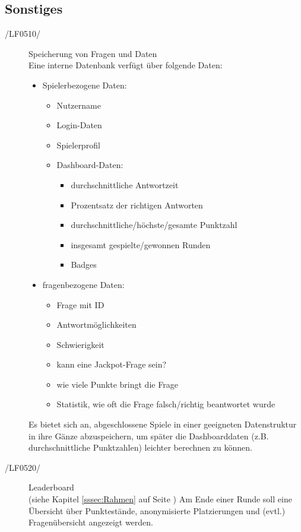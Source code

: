 \documentclass[11pt,a4paper]{scrreprt}
\begin{document}
\subsection{Sonstiges}
\begin{description}
\item[/LF0510/] Speicherung von Fragen und Daten \\
Eine interne Datenbank verfügt über folgende Daten:
	\begin{itemize}
	\item Spielerbezogene Daten:
		\begin{itemize}
		\item Nutzername
		\item Login-Daten
		\item Spielerprofil
		\item Dashboard-Daten:
			\begin{itemize}
			\item durchschnittliche Antwortzeit
			\item Prozentsatz der richtigen Antworten
			\item durchschnittliche/höchste/gesamte Punktzahl
			\item insgesamt gespielte/gewonnen Runden
			\item Badges
			\end{itemize}
		\end{itemize}
	\item fragenbezogene Daten:
		\begin{itemize}
		\item Frage mit ID
		\item Antwortmöglichkeiten
		\item Schwierigkeit
		\item kann eine Jackpot-Frage sein?
		\item wie viele Punkte bringt die Frage
		\item Statistik, wie oft die Frage falsch/richtig beantwortet wurde
		\end{itemize}
	\end{itemize}
Es bietet sich an, abgeschlossene Spiele in einer geeigneten Datenstruktur in ihre Gänze abzuspeichern, um später die Dashboarddaten (z.B. durchschnittliche Punktzahlen) leichter berechnen zu können.
\end{description}

\begin{description}


\item[/LF0520/] Leaderboard \\
(siehe Kapitel \ref{sssec:Rahmen} auf Seite \pageref{sssec:Rahmen}) Am Ende einer Runde soll eine Übersicht über Punktestände, anonymisierte Platzierungen und (evtl.) Fragenübersicht angezeigt werden.
\end{description}
\end{document}
